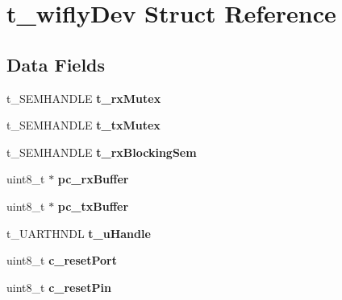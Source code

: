 \hypertarget{structt__wifly_dev}{\section{t\-\_\-wifly\-Dev Struct Reference}
\label{structt__wifly_dev}
}
\subsection*{Data Fields}
\begin{DoxyCompactItemize}
\item 
\hypertarget{structt__wifly_dev_a6c668c5c6ef7ecd4aa0eeca1dc3352cf}{t\-\_\-\-S\-E\-M\-H\-A\-N\-D\-L\-E {\bfseries t\-\_\-rx\-Mutex}}\label{structt__wifly_dev_a6c668c5c6ef7ecd4aa0eeca1dc3352cf}

\item 
\hypertarget{structt__wifly_dev_a17abeacecc1a41425fc9fd04a89e026e}{t\-\_\-\-S\-E\-M\-H\-A\-N\-D\-L\-E {\bfseries t\-\_\-tx\-Mutex}}\label{structt__wifly_dev_a17abeacecc1a41425fc9fd04a89e026e}

\item 
\hypertarget{structt__wifly_dev_aedc039854e5cfc913eb025a5b4d8e744}{t\-\_\-\-S\-E\-M\-H\-A\-N\-D\-L\-E {\bfseries t\-\_\-rx\-Blocking\-Sem}}\label{structt__wifly_dev_aedc039854e5cfc913eb025a5b4d8e744}

\item 
\hypertarget{structt__wifly_dev_ac1c2da1a72060bac35e06148ebd88908}{uint8\-\_\-t $\ast$ {\bfseries pc\-\_\-rx\-Buffer}}\label{structt__wifly_dev_ac1c2da1a72060bac35e06148ebd88908}

\item 
\hypertarget{structt__wifly_dev_a586fa834cf693ea9de05dfd6a7d4e89c}{uint8\-\_\-t $\ast$ {\bfseries pc\-\_\-tx\-Buffer}}\label{structt__wifly_dev_a586fa834cf693ea9de05dfd6a7d4e89c}

\item 
\hypertarget{structt__wifly_dev_adff9fcc9b301fd4d7521fb37d7490034}{t\-\_\-\-U\-A\-R\-T\-H\-N\-D\-L {\bfseries t\-\_\-u\-Handle}}\label{structt__wifly_dev_adff9fcc9b301fd4d7521fb37d7490034}

\item 
\hypertarget{structt__wifly_dev_acb0d8d132b658f993e6ac65fb0d0ae5e}{uint8\-\_\-t {\bfseries c\-\_\-reset\-Port}}\label{structt__wifly_dev_acb0d8d132b658f993e6ac65fb0d0ae5e}

\item 
\hypertarget{structt__wifly_dev_a1ee0c0699d1dbe284528184449423455}{uint8\-\_\-t {\bfseries c\-\_\-reset\-Pin}}\label{structt__wifly_dev_a1ee0c0699d1dbe284528184449423455}


\end{DoxyCompactItemize}
